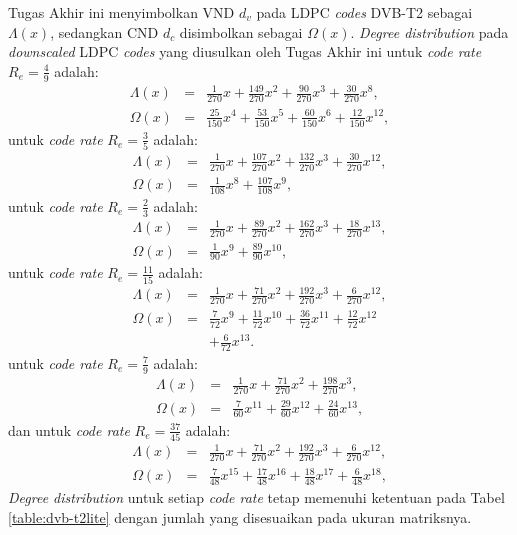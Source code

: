 Tugas Akhir ini menyimbolkan VND $d_v$ pada LDPC \textit{codes} DVB-T2 sebagai $\Lambda (x)$, sedangkan CND $d_c$ disimbolkan sebagai $\Omega(x)$. \textit{Degree distribution} pada \textit{downscaled} LDPC \textit{codes} yang diusulkan oleh Tugas Akhir ini untuk \textit{code rate} $R_e=\frac{4}{9}$ adalah:
\begin{eqnarray}
\Lambda (x)&=&\frac{1}{270}x+\frac{149}{270}x^2+\frac{90}{270}x^3+\frac{30}{270}x^8, \\
\Omega(x)&=&\frac{25}{150}x^4+\frac{53}{150}x^5+\frac{60}{150}x^6+\frac{12}{150}x^{12},
\end{eqnarray}
untuk \textit{code rate} $R_e=\frac{3}{5}$ adalah:
\begin{eqnarray}
\Lambda (x)&=&\frac{1}{270}x+\frac{107}{270}x^2+\frac{132}{270}x^3+\frac{30}{270}x^{12},\\
\Omega(x)&=&\frac{1}{108}x^8+\frac{107}{108}x^9,
\end{eqnarray}
untuk \textit{code rate} $R_e=\frac{2}{3}$ adalah:
\begin{eqnarray}
\Lambda (x)&=&\frac{1}{270}x+\frac{89}{270}x^{2}+\frac{162}{270}x^{3}+\frac{18}{270}x^{13},\\
\Omega(x)&=&\frac{1}{90}x^{9}+\frac{89}{90}x^{10},
\end{eqnarray}
untuk \textit{code rate} $R_e=\frac{11}{15}$ adalah:
\begin{eqnarray}
\Lambda (x)&=&\frac{1}{270}x+\frac{71}{270}x^{2}+\frac{192}{270}x^{3}+\frac{6}{270}x^{12},\\
\Omega(x)&=&\frac{7}{72}x^{9}+\frac{11}{72}x^{10}+\frac{36}{72}x^{11}+\frac{12}{72}x^{12} \nonumber \\ &&+\frac{6}{72}x^{13}.
\end{eqnarray}
untuk \textit{code rate} $R_e=\frac{7}{9}$ adalah:
\begin{eqnarray}
\Lambda (x)&=&\frac{1}{270}x+\frac{71}{270}x^2+\frac{198}{270}x^3,\\
\Omega(x)&=&\frac{7}{60}x^{11}+\frac{29}{60}x^{12}+\frac{24}{60}x^{13},
\end{eqnarray}
dan untuk \textit{code rate} $R_e=\frac{37}{45}$ adalah:
\begin{eqnarray}
\Lambda (x)&=&\frac{1}{270}x+\frac{71}{270}x^{2}+\frac{192}{270}x^{3}+\frac{6}{270}x^{12},\\
\Omega(x)&=&\frac{7}{48}x^{15}+\frac{17}{48}x^{16}+\frac{18}{48}x^{17}+\frac{6}{48}x^{18},
\end{eqnarray}
\textit{Degree distribution} untuk setiap \textit{code rate} tetap memenuhi ketentuan pada Tabel \ref{table:dvb-t2lite} dengan jumlah yang disesuaikan pada ukuran matriksnya.

